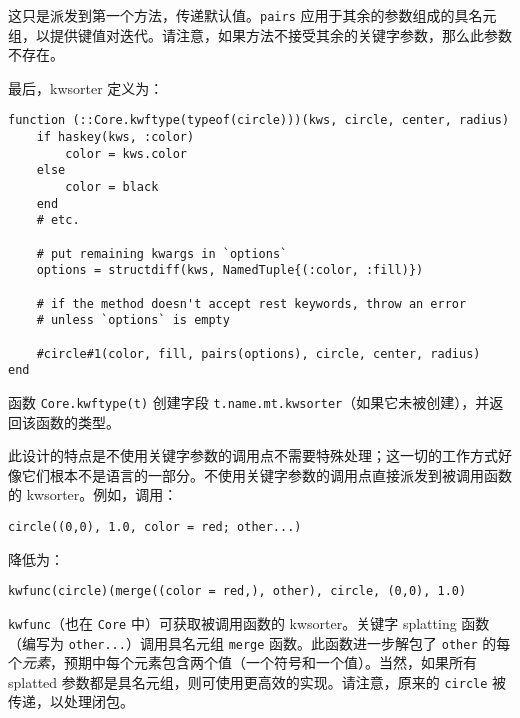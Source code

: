 这只是派发到第一个方法，传递默认值。\texttt{pairs} 应用于其余的参数组成的具名元组，以提供键值对迭代。请注意，如果方法不接受其余的关键字参数，那么此参数不存在。



最后，kwsorter 定义为：




\begin{lstlisting}
function (::Core.kwftype(typeof(circle)))(kws, circle, center, radius)
    if haskey(kws, :color)
        color = kws.color
    else
        color = black
    end
    # etc.

    # put remaining kwargs in `options`
    options = structdiff(kws, NamedTuple{(:color, :fill)})

    # if the method doesn't accept rest keywords, throw an error
    # unless `options` is empty

    #circle#1(color, fill, pairs(options), circle, center, radius)
end
\end{lstlisting}



函数 \texttt{Core.kwftype(t)} 创建字段 \texttt{t.name.mt.kwsorter}（如果它未被创建），并返回该函数的类型。



此设计的特点是不使用关键字参数的调用点不需要特殊处理；这一切的工作方式好像它们根本不是语言的一部分。不使用关键字参数的调用点直接派发到被调用函数的 kwsorter。例如，调用：




\begin{verbatim}
circle((0,0), 1.0, color = red; other...)
\end{verbatim}



降低为：




\begin{verbatim}
kwfunc(circle)(merge((color = red,), other), circle, (0,0), 1.0)
\end{verbatim}



\texttt{kwfunc}（也在 \texttt{Core} 中）可获取被调用函数的 kwsorter。关键字 splatting 函数（编写为 \texttt{other...}）调用具名元组 \texttt{merge} 函数。此函数进一步解包了 \texttt{other} 的每个\emph{元素}，预期中每个元素包含两个值（一个符号和一个值）。当然，如果所有 splatted 参数都是具名元组，则可使用更高效的实现。请注意，原来的 \texttt{circle} 被传递，以处理闭包。



